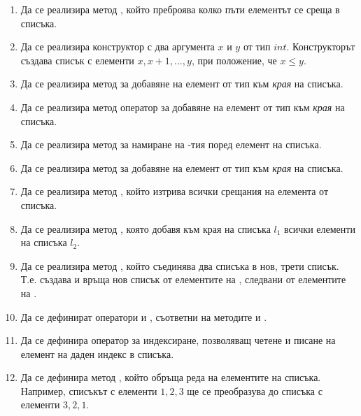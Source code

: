 \begin{enumerate}

  \item Да се реализира метод , който преброява колко пъти елементът  се среща в списъка.

  \item Да се реализира конструктор с два аргумента $x$ и $y$ от тип $int$. Конструкторът създава списък с елементи $x, x+1, ..., y$, при положение, че $x \leq y$.

  \item Да се реализира метод  за добавяне на елемент от тип  към \textit{края} на списъка.

  \item Да се реализира метод оператор  за добавяне на елемент от тип  към \textit{края} на списъка.

  \item Да се реализира метод  за намиране на -тия поред елемент на списъка.

  \item Да се реализира метод  за добавяне на елемент от тип  към \textit{края} на списъка.

  \item Да се реализира метод , който изтрива всички срещания на елемента  от списъка.

  \item Да се реализира метод , която добавя към края на списъка $l_1$ всички елементи на списъка $l_2$.

  \item Да се реализира метод , който съединява два списъка в нов, трети списък. Т.е.  създава и връща нов списък от елементите на , следвани от елементите на .

  \item Да се дефинират оператори  и , съответни на методите  и .

  \item Да се дефинира оператор за индексиране, позволяващ четене и писане на елемент на даден индекс в списъка.

  \item Да се дефинира метод , който обръща реда на елементите на списъка. Например, списъкът с елементи $1,2,3$ ще се преобразува до списъка с елементи $3,2,1$.


\end{enumerate}
